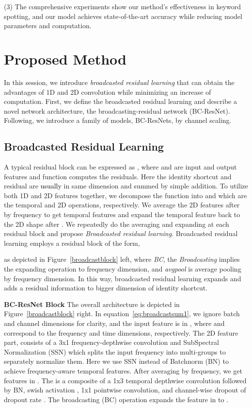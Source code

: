 \documentclass[a4paper]{article}
\newcommand\bg[1]{\textcolor{blue}{#1}}
\renewcommand\bg[1]{\textcolor{black}{#1}}
\begin{document}
(3) The comprehensive experiments show our method's effectiveness in keyword spotting, and our model achieves state-of-the-art accuracy while reducing model parameters and computation.

\section{Proposed Method}

In this session, we introduce \textit{broadcasted residual learning} that can obtain the advantages of 1D and 2D convolution while minimizing an increase of computation. First, we define the broadcasted residual learning and describe a novel network architecture, the broadcasting-residual network (BC-ResNet). 
Following, we introduce a family of models, BC-ResNets, by channel scaling.

\subsection{Broadcasted Residual Learning}

A typical residual block \cite{residual} can be expressed as , where  and  are input and output features and function  computes the residuals. Here the identity shortcut  and residual  are \bg{usually} in same dimension and summed by simple addition. 
To utilize both 1D and 2D features together, we decompose the function  into  and  which are the temporal and 2D operations, respectively. We average the 2D features after  by frequency to get temporal features and expand the temporal feature back to the 2D shape after . We repeatedly do the averaging and expanding at each residual block and propose \textit{Broadcasted residual learning}. Broadcasted residual learning employs a residual block of the form, 

as depicted in Figure~\ref{broadcastblock} left, where \textit{BC}, the \textit{Broadcasting} implies the expanding operation to frequency dimension, and \textit{avgpool} is average pooling by frequency dimension. In this way, broadcasted residual learning expands and adds a residual information to bigger dimension of identity shortcut.

\noindent \textbf{BC-ResNet Block} The overall architecture is depicted in Figure~\ref{broadcastblock} right. In equation~\ref{eq:broadcastsum1}, we ignore batch and channel dimensions for clarity, and the input feature  is in , where  and  correspond to the frequency and time dimensions, respectively. The 2D feature part,  consists of a 3x1 frequency-depthwise convolution and SubSpectral Normalization (SSN) \cite{ssn} which splits the input frequency into multi-groups to separately normalize them. Here we use SSN instead of Batchnorm (BN) \cite{batchnorm} to achieve frequency-aware temporal features. After averaging by frequency, we get features in . The  is a composite of a 1x3 temporal depthwise convolution followed by BN, swish activation \cite{swish}, 1x1 pointwise convolution, and channel-wise dropout of dropout rate . The broadcasting (BC) operation expands the feature in  to .
\end{document}
